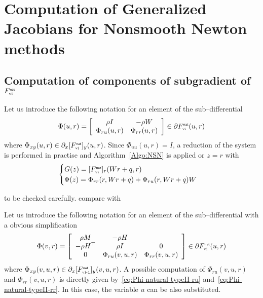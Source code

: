\section{Computation of Generalized Jacobians for Nonsmooth Newton methods}
\subsection{Computation of components of subgradient of $F_{{\hbox{\tiny{vi}}}}^{\hbox{\sf \tiny{nat}}}$}



 Let us introduce the following notation for an element of the sub--differential
\begin{equation}
  \label{eq:Phi-natural-typeII}
  \Phi(u, r)  = \left[
  \begin{array}{cc}
    \rho  I  &   - \rho W \\
     \Phi_{r u}(u,r) &   \Phi_{r r}(u,r)
  \end{array}\right] \in \partial F_{\vitwo}^\nat(u,r)
\end{equation}
where $ \Phi_{x y}(u,r) \in \partial_{x}[F_{{\hbox{\tiny{vi}}}}^{\hbox{\sf \tiny{nat}}}]_{y}(u,r)$. Since $\Phi_{u u}(u,r) = I $, a reduction of the system is performed in practise and Algorithm~\ref{Algo:NSN} is applied or $z =r$ with
\begin{equation}
  \label{eq:phiphi_ter}
  \begin{cases}
    G(z) = [F_{\vitwo}^\nat]_{r}(Wr+q,r) \\
    \Phi(z) = \Phi_{rr}(r,Wr+q) + \Phi_{ru}(r,Wr+q) W
  \end{cases}
\end{equation}
\begin{ndrva}
  to be checked carefully. compare with \cite{Hayashi.ea_SIOPT2005}
\end{ndrva}

 Let us introduce the following notation for an element of the sub--differential with a obvious simplification
\begin{equation}
  \label{eq:Phi-natural-typeI}
  \Phi(v,  r)  = \left[
  \begin{array}{ccc}
   \rho M &  - \rho H  \\
   -\rho H^\top &  \rho I &   0  \\
   0  &   \Phi_{r u}(v,u,r) &   \Phi_{r r}(v,u,r)
 \end{array}\right] \in \partial F_{\vitwo}^\nat(u,r)
\end{equation}
where $ \Phi_{x y}(v,u,r) \in \partial_{x}[F_{{\hbox{\tiny{vi-1}}}}^{\hbox{\sf \tiny{nat}}}]_{y}(v,u,r)$. A possible computation of  $\Phi_{r u}(v,u,r)$ and $\Phi_{r r}(v,u,r) $ is directly given by~\eqref{eq:Phi-natural-typeII-ru} and~\eqref{eq:Phi-natural-typeII-rr}. In this case, the variable $u$ can be also substituted.







